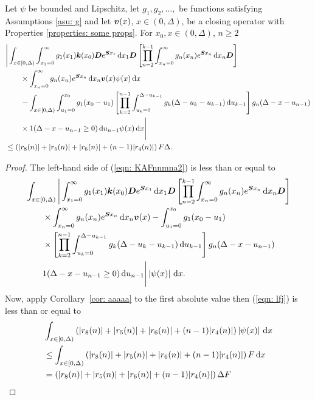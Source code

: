 \begin{cor}
	Let \(\psi\) be bounded and Lipschitz, let \(g_1,g_2,\dots,\) be functions satisfying Assumptions \ref{asu: g} and let \({\boldsymbol v}(x)\), \(x\in(0,\Delta)\), be a closing operator with Properties \ref{properties: some props}. For \(x_0,x\in(0,\Delta)\), \(n\geq 2\)
	\begin{align}
		&\Bigg| \int_{x\in[0,\Delta)} \int_{x_1=0}^\infty g_1(x_1) \boldsymbol k(x_0) \boldsymbol D e^{\boldsymbol{S}x_1}\, \mathrm{d} x_1\boldsymbol D 
            	\left[\prod_{n=2}^{k-1}\int_{x_n=0}^\infty g_n(x_n) e^{\boldsymbol{S}x_n} \, \mathrm{d} x_n
		\boldsymbol D\right] \nonumber 
            	\\&\qquad{}\times\int_{x_n=0}^\infty g_{n}(x_n) e^{\boldsymbol{S}x_n} \, \mathrm{d} x_n {\boldsymbol v}(x) \psi(x)\, \mathrm{d} x \nonumber 
		\\&\qquad {}- \int_{x\in[0,\Delta)} \int_{u_1=0}^{x_0}g_1(x_0 - u_1)
		\left[\prod_{k=2}^{n-1} \int_{u_k=0}^{\Delta-u_{k-1}} g_k(\Delta-u_k-u_{k-1})\, \mathrm{d} u_{k-1}\right] \nonumber 
            	g_{n}(\Delta - x-u_{n-1})
	\\&\qquad{} \times1(\Delta-x-u_{n-1}\geq0)\, \mathrm{d} u_{n-1}\psi(x)\, \mathrm{d} x \Bigg| \nonumber
		\\&\leq \left(|r_8(n)|+|r_5(n)|+|r_6(n)| + (n-1)|r_4(n)|\right)F\Delta.\label{eqn: KAFnnmna2}
	\end{align}
\end{cor}
\begin{proof}
	The left-hand side of (\ref{eqn: KAFnnmna2}) is less than or equal to 
	\begin{align}
		& \int_{x\in[0,\Delta)} \Bigg| \int_{x_1=0}^\infty g_1(x_1) \boldsymbol k(x_0) \boldsymbol D e^{\boldsymbol{S}x_1}\, \mathrm{d} x_1\boldsymbol D 
            	\left[\prod_{n=2}^{k-1}\int_{x_n=0}^\infty g_n(x_n) e^{\boldsymbol{S}x_n} \, \mathrm{d} x_n
		\boldsymbol D\right] \nonumber 
            	\\&\qquad {}\times\int_{x_n=0}^\infty g_{n}(x_n) e^{\boldsymbol{S}x_n} \, \mathrm{d} x_n {\boldsymbol v}(x)  \nonumber 
		- \int_{u_1=0}^{x_0}g_1(x_0 - u_1)
		\\&\qquad {}\times \left[\prod_{k=2}^{n-1} \int_{u_k=0}^{\Delta-u_{k-1}} g_k(\Delta-u_k-u_{k-1})\, \mathrm{d} u_{k-1}\right] \nonumber 
            	g_{n}(\Delta - x-u_{n-1})
	\\&\qquad{} 1(\Delta-x-u_{n-1}\geq0)\, \mathrm{d} u_{n-1}\Bigg| \left|\psi(x)\right|\, \mathrm{d} x . \label{eqn: lfj}
	\end{align}
	Now, apply Corollary~\ref{cor: aaaaa} to the first absolute value then (\ref{eqn: lfj}) is less than or equal to 
	\begin{align}
		&\int_{x\in[0,\Delta)} \left(|r_8(n)|+|r_5(n)|+|r_6(n)| + (n-1)|r_4(n)|\right) \left|\psi(x)\right|\, \mathrm{d} x  \nonumber 
		\\&\leq \int_{x\in[0,\Delta)} \left(|r_8(n)|+|r_5(n)|+|r_6(n)| + (n-1)|r_4(n)|\right) F\, \mathrm{d} x  \nonumber 
		\\&=  \left(|r_8(n)|+|r_5(n)|+|r_6(n)| + (n-1)|r_4(n)|\right) \Delta F
	\end{align}
\end{proof}

